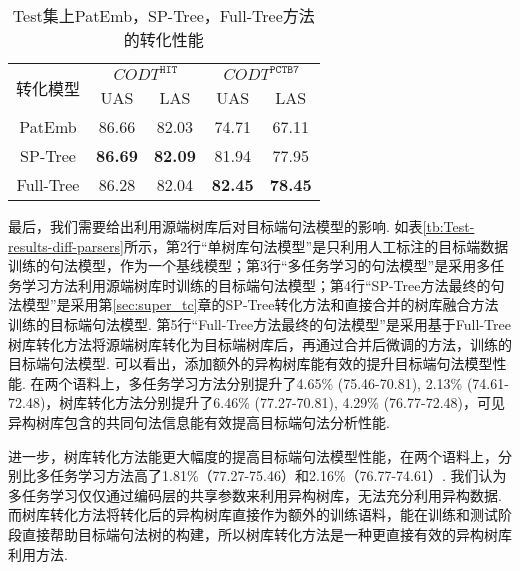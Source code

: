 \begin{table}[hb!]
    \addtolength{\tabcolsep}{+1.0mm}
    \centering
    \caption{Test集上PatEmb，SP-Tree，Full-Tree方法的转化性能}
    \label{tb:Test-results}
    \begin{tabular}{c cc cc}
        \toprule
        \multirow{2}{1.5cm}{转化模型} & \multicolumn{2}{c}{$CODT^{\texttt{HIT}}$} & \multicolumn{2}{c}{$CODT^{\texttt{PCTB7}}$}                       \\
        \cmidrule(lr){2-3}
        \cmidrule(lr){4-5}
                                      & UAS                                       & LAS                                         & UAS      & LAS      \\
        \midrule
        PatEmb                        & 86.66                                     & 82.03                                       & 74.71    & 67.11    \\
        SP-Tree                       & \bf86.69                                  & \bf82.09                                    & 81.94    & 77.95    \\
        Full-Tree                     & 86.28                                     & 82.04                                       & \bf82.45 & \bf78.45 \\
        \bottomrule
    \end{tabular}
\end{table}

最后，我们需要给出利用源端树库后对目标端句法模型的影响. 如表\ref{tb:Test-results-diff-parsers}所示，第2行“单树库句法模型”是只利用人工标注的目标端数据训练的句法模型，作为一个基线模型；第3行“多任务学习的句法模型”是采用多任务学习方法利用源端树库时训练的目标端句法模型；第4行“SP-Tree方法最终的句法模型”是采用第\ref{sec:super_tc}章的SP-Tree转化方法和直接合并的树库融合方法训练的目标端句法模型. 第5行“Full-Tree方法最终的句法模型”是采用基于Full-Tree树库转化方法将源端树库转化为目标端树库后，再通过合并后微调的方法，训练的目标端句法模型. 可以看出，添加额外的异构树库能有效的提升目标端句法模型性能. 在两个语料上，多任务学习方法分别提升了4.65\% (75.46-70.81), 2.13\% (74.61-72.48)，树库转化方法分别提升了6.46\% (77.27-70.81), 4.29\% (76.77-72.48)，可见异构树库包含的共同句法信息能有效提高目标端句法分析性能.

进一步，树库转化方法能更大幅度的提高目标端句法模型性能，在两个语料上，分别比多任务学习方法高了1.81\%（77.27-75.46）和2.16\%（76.77-74.61）. 我们认为多任务学习仅仅通过编码层的共享参数来利用异构树库，无法充分利用异构数据. 而树库转化方法将转化后的异构树库直接作为额外的训练语料，能在训练和测试阶段直接帮助目标端句法树的构建，所以树库转化方法是一种更直接有效的异构树库利用方法.

